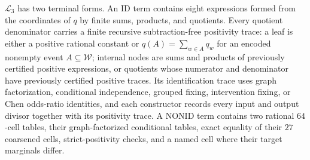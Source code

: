 \(\mathcal L_3\) has two terminal forms. An \(\mathrm{ID}\) term contains eight expressions formed from the coordinates of \(q\) by finite sums, products, and quotients. Every quotient denominator carries a finite recursive subtraction-free positivity trace: a leaf is either a positive rational constant or \(q(A)=\sum_{w\in A}q_w\) for an encoded nonempty event \(A\subseteq\mathcal W\); internal nodes are sums and products of previously certified positive expressions, or quotients whose numerator and denominator have previously certified positive traces. Its identification trace uses graph factorization, conditional independence, grouped fixing, intervention fixing, or Chen odds-ratio identities, and each constructor records every input and output divisor together with its positivity trace. A \(\mathrm{NONID}\) term contains two rational \(64\)-cell tables, their graph-factorized conditional tables, exact equality of their \(27\) coarsened cells, strict-positivity checks, and a named cell where their target marginals differ.